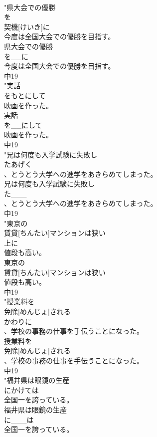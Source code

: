 \documentclass[8pt]{extreport}
\begin{document}
\begin{CJK}{UTF8}{min}
\\	"県大会での優勝
\\	を
\\	契機[けいき]に
\\	今度は全国大会での優勝を目指す。
\\	県大会での優勝
\\	を__に
\\	今度は全国大会での優勝を目指す。
\\	中19
\\	"実話
\\	をもとにして
\\	映画を作った。
\\	実話
\\	を__にして
\\	映画を作った。
\\	中19
\\	"兄は何度も入学試験に失敗し
\\	たあげく
\\	、とうとう大学への進学をあきらめてしまった。
\\	兄は何度も入学試験に失敗し
\\	た___
\\	、とうとう大学への進学をあきらめてしまった。
\\	中19
\\	"東京の
\\	賃貸[ちんたい]マンションは狭い
\\	上に
\\	値段も高い。
\\	東京の
\\	賃貸[ちんたい]マンションは狭い
\\	値段も高い。
\\	中19
\\	"授業料を
\\	免除[めんじょ]される
\\	かわりに
\\	、学校の事務の仕事を手伝うことになった。
\\	授業料を
\\	免除[めんじょ]される
\\	、学校の事務の仕事を手伝うことになった。
\\	中19
\\	"福井県は眼鏡の生産
\\	にかけては
\\	全国一を誇っている。
\\	福井県は眼鏡の生産
\\	に___は
\\	全国一を誇っている。

\end{CJK}
\end{document}
